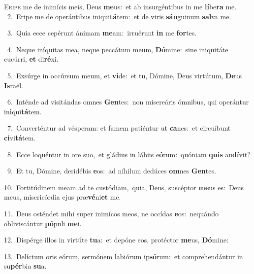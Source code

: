 \lettrine{\initial\textcolor{\initialcolor}{E}}{ripe} me de inimícis meis, Deus \textbf{me}\-us:~\star et ab insurgéntibus in me \textbf{lí}\-be\textbf{ra} me.\\
{\numbfont\textcolor{\numbcolor}{~2.}}~Eripe me de operántibus iniqui\-\textbf{tá}\-tem:~\star et de viris \textbf{sán}\-guinum \textbf{sal}\-va me.\par
{\numbfont\textcolor{\numbcolor}{~3.}}~Quia ecce cepérunt ánimam \textbf{me}\-am:~\star irruérunt \textbf{in} me \textbf{for}\-tes.\par
{\numbfont\textcolor{\numbcolor}{~4.}}~Neque iníquitas mea, neque peccátum meum, \textbf{Dó}\-mine:~\star sine iniquitáte cucúrri, \textbf{et} di\-\textbf{ré}\-xi.\par
{\numbfont\textcolor{\numbcolor}{~5.}}~Exsúrge in occúrsum meum, et \textbf{vi}\-de:~\star et tu, Dómine, Deus virtútum, \textbf{De}\-us \textbf{Is}\-raël.\par
{\numbfont\textcolor{\numbcolor}{~6.}}~Inténde ad visitándas omnes \textbf{Gen}\-tes:~\star non misereáris ómnibus, qui operántur in\-\textbf{i}\-qui\-\textbf{tá}\-tem.\par
{\numbfont\textcolor{\numbcolor}{~7.}}~Converténtur ad vésperam: et famem patiéntur ut \textbf{ca}\-nes:~\star et circuíbunt \textbf{ci}\-vi\-\textbf{tá}\-tem.\par
{\numbfont\textcolor{\numbcolor}{~8.}}~Ecce loquéntur in ore suo,~\dagger et gládius in lábiis e\-\textbf{ó}\-rum:~\star quóniam \textbf{quis} au\-\textbf{dí}\-vit?\par
{\numbfont\textcolor{\numbcolor}{~9.}}~Et tu, Dómine, deridébis \textbf{e}\-os:~\star ad níhilum dedúces \textbf{om}\-nes \textbf{Gen}\-tes.\par
{\numbfont\textcolor{\numbcolor}{10.}}~Fortitúdinem meam ad te custódiam,~\dagger quia, Deus, suscéptor \textbf{me}\-us es:~\star Deus meus, misericórdia ejus præ\-\textbf{vé}\-ni\textbf{et} me.\par
{\numbfont\textcolor{\numbcolor}{11.}}~Deus osténdet mihi super inimícos meos, ne occídas \textbf{e}\-os:~\star nequándo obliviscántur \textbf{pó}\-puli \textbf{me}\-i.\par
{\numbfont\textcolor{\numbcolor}{12.}}~Dispérge illos in virtúte \textbf{tu}\-a:~\star et depóne eos, protéctor \textbf{me}\-us, \textbf{Dó}\-mine:\par
{\numbfont\textcolor{\numbcolor}{13.}}~Delíctum oris eórum, sermónem labiórum ip\-\textbf{só}\-rum:~\star et comprehendántur in su\-\textbf{pér}\-bia \textbf{su}\-a.\par
